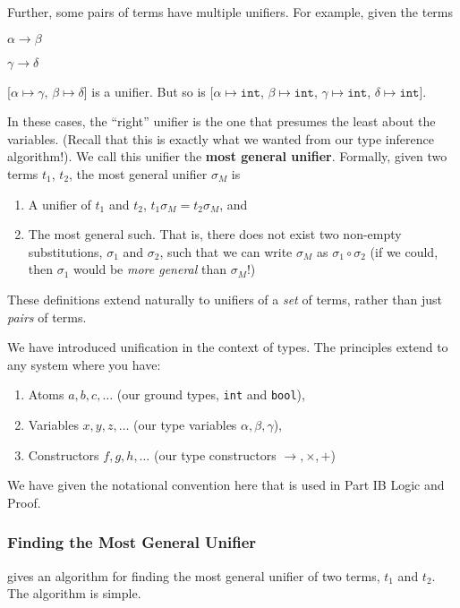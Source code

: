 {Further, some pairs of terms have multiple unifiers. For example, given the terms

\begin{minipage}[t]{0.5\textwidth}
\centering
$\alpha \to \beta$
\end{minipage}%
\begin{minipage}[t]{0.5\textwidth}
\centering
$\gamma \to \delta$
\end{minipage}

[$\alpha \mapsto \gamma$, $\beta \mapsto \delta$] is a unifier. But so is [$\alpha \mapsto \texttt{int}$, $\beta \mapsto \texttt{int}$, $\gamma \mapsto \texttt{int}$, $\delta \mapsto \texttt{int}$].

In these cases, the ``right'' unifier is the one that presumes the least about the variables. (Recall that this is exactly what we wanted from our type inference algorithm!). We call this unifier the \textbf{most general unifier}. Formally, given two terms $t_1$, $t_2$, the most general unifier $\sigma_M$ is
\begin{enumerate}
    \item A unifier of $t_1$ and $t_2$, $t_1 \sigma_M = t_2 \sigma_M$, and
    \item The most general such. That is, there does not exist two non-empty substitutions, $\sigma_1$ and $\sigma_2$, such that we can write $\sigma_M$ as $\sigma_1 \circ \sigma_2$ (if we could, then $\sigma_1$ would be \textit{more general} than $\sigma_M$!)
\end{enumerate}

These definitions extend naturally to unifiers of a \textit{set} of terms, rather than just \textit{pairs} of terms.

We have introduced unification in the context of types. The principles extend to any system where you have:

\begin{enumerate}
    \item Atoms $a, b, c, \ldots$ (our ground types, \texttt{int} and \texttt{bool}),
    \item Variables $x, y, z, \ldots$ (our type variables $\alpha, \beta, \gamma$),
    \item Constructors $f, g, h, \ldots$ (our type constructors $\to, \times, +$)
\end{enumerate}

We have given the notational convention here that is used in \textsf{Part IB Logic and Proof}.

\subsubsection{Finding the Most General Unifier}
\citet{robinson-1965} gives an algorithm for finding the most general unifier of two terms, $t_1$ and $t_2$. The algorithm is simple.

}
